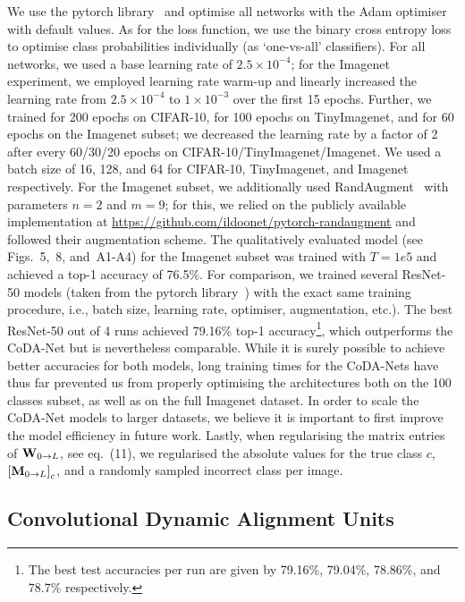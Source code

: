  We use the pytorch library~ and optimise all networks with the Adam optimiser~ with default values.
As for the loss function, we use the binary cross entropy loss to optimise class probabilities individually (as `one-vs-all' classifiers).
For all networks, we used a base learning rate of $2.5 \times10^{-4}$; for the Imagenet experiment, we employed learning rate warm-up and linearly increased the learning rate from $2.5 \times10^{-4}$ to $1 \times10^{-3}$ over the first 15 epochs.
Further, we trained for 200 epochs on CIFAR-10, for 100 epochs on TinyImagenet, and for 60 epochs on the Imagenet subset; we decreased the learning rate by a factor of 2 after every 60/30/20 epochs on CIFAR-10/TinyImagenet/Imagenet.
We used a batch size of 16, 128, and 64 for CIFAR-10, TinyImagenet, and Imagenet respectively. For the Imagenet subset, we additionally used RandAugment~ with parameters $n=2$ and $m=9$; for this, we relied on the publicly available implementation at \url{https://github.com/ildoonet/pytorch-randaugment} and followed their augmentation scheme. The qualitatively evaluated model (see Figs.~5,~8, and~A1-A4) for the Imagenet subset was trained with $T=1e5$ and achieved a top-1 accuracy of 76.5\%. For comparison, we trained several ResNet-50 models (taken from the pytorch library~) with the exact same training procedure, i.e., batch size, learning rate, optimiser, augmentation, etc.). The best ResNet-50 out of 4 runs achieved 79.16\% top-1 accuracy\footnote{The best test accuracies per run are given by 79.16\%, 79.04\%, 78.86\%, and 78.7\% respectively.}, which outperforms the CoDA-Net but is nevertheless comparable. While it is surely possible to achieve better accuracies for both models, long training times for the CoDA-Nets have thus far prevented us from properly optimising the architectures both on the 100 classes subset, as well as on the full Imagenet dataset. In order to scale the CoDA-Net models to larger datasets, we believe it is important to first improve the model efficiency in future work.
Lastly, when regularising the matrix entries of $\mat W_{0\rightarrow L}$, see eq.~(11),
    we regularised the absolute values for the true class $c$, $\left[\mat M_{0\rightarrow L}\right]_c$,
    and a randomly sampled incorrect class per image.
    
    
% 
% 
\subsection{Convolutional Dynamic Alignment Units}
\label{subsec:CoDAUs}

